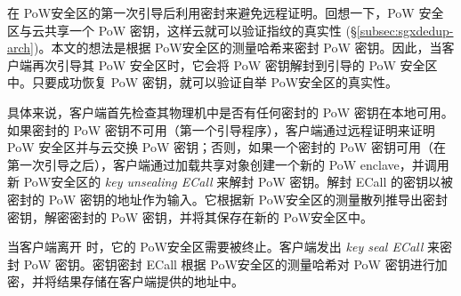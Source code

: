 \sysnameS 在 PoW安全区的第一次引导后利用密封来避免远程证明。回想一下，PoW 安全区与云共享一个 PoW 密钥，这样云就可以验证指纹的真实性 (\S\ref{subsec:sgxdedup-arch})。本文的想法是根据 PoW安全区的测量哈希来密封 PoW 密钥。因此，当客户端再次引导其 PoW 安全区时，它会将 PoW 密钥解封到引导的 PoW 安全区中。只要成功恢复 PoW 密钥，就可以验证自举 PoW安全区的真实性。

具体来说，客户端首先检查其物理机中是否有任何密封的 PoW 密钥在本地可用。如果密封的 PoW 密钥不可用（第一个引导程序），客户端通过远程证明来证明 PoW 安全区并与云交换 PoW 密钥；否则，如果一个密封的 PoW 密钥可用（在第一次引导之后），客户端通过加载共享对象创建一个新的 PoW enclave，并调用新 PoW安全区的 \textit{ key unsealing ECall} 来解封 PoW 密钥。解封 ECall 的密钥以被密封的 PoW 密钥的地址作为输入。它根据新 PoW安全区的测量散列推导出密封密钥，解密密封的 PoW 密钥，并将其保存在新的 PoW安全区中。

当客户端离开 \sysnameS 时，它​​的 PoW安全区需要被终止。客户端发出 \textit{ key seal ECall} 来密封 PoW 密钥。密钥密封 ECall 根据 PoW安全区的测量哈希对 PoW 密钥进行加密，并将结果存储在客户端提供的地址中。